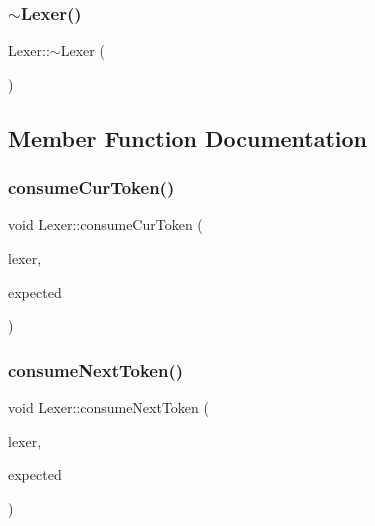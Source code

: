 \subsubsection{\texorpdfstring{$\sim$Lexer()}{~Lexer()}}
{\footnotesize\ttfamily Lexer\+::$\sim$\+Lexer (\begin{DoxyParamCaption}{ }\end{DoxyParamCaption})}



\subsection{Member Function Documentation}
\mbox{\label{class_lexer_acfbc499dc83e3b7100a037e228eeba25}} 
\subsubsection{\texorpdfstring{consumeCurToken()}{consumeCurToken()}}
{\footnotesize\ttfamily void Lexer\+::consume\+Cur\+Token (\begin{DoxyParamCaption}\item[{\mbox{\hyperlink{class_lexer}{Lexer}} $\ast$}]{lexer,  }\item[{\mbox{\hyperlink{tanpero__token_8hpp_aa520fbf142ba1e7e659590c07da31921}{Token\+Type}}}]{expected }\end{DoxyParamCaption})}

\mbox{\label{class_lexer_a1f77f9ba59aa650cdf1bcf3e89ea8d26}} 
\subsubsection{\texorpdfstring{consumeNextToken()}{consumeNextToken()}}
{\footnotesize\ttfamily void Lexer\+::consume\+Next\+Token (\begin{DoxyParamCaption}\item[{\mbox{\hyperlink{class_lexer}{Lexer}} $\ast$}]{lexer,  }\item[{\mbox{\hyperlink{tanpero__token_8hpp_aa520fbf142ba1e7e659590c07da31921}{Token\+Type}}}]{expected }\end{DoxyParamCaption})}

\mbox{\label{class_lexer_abfe67c88132256e11bb2e1b910c369db}} 
